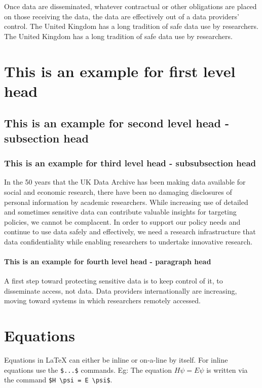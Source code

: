 \documentclass[unnumsec,webpdf,contemporary,large]{oup-authoring-template}%
\theoremstyle{thmstyleone}%
\theoremstyle{thmstyletwo}%
\theoremstyle{thmstylethree}%
\begin{document}
Once data are disseminated, whatever contractual or other obligations are placed on those receiving the data, the data
are effectively out of a data providers' control.  The United Kingdom has a long tradition of safe data use by researchers.
The United Kingdom has a long tradition of safe data use by researchers.

\section{This is an example for first level head}\label{sec3}

\subsection{This is an example for second level head - subsection head}\label{subsec2}

\subsubsection{This is an example for third level head - subsubsection head}\label{subsubsec2}

In the 50 years that the UK Data Archive has been making data available for social and economic research, there have been no
damaging disclosures of personal information by academic researchers. While increasing use of detailed and sometimes sensitive
data can contribute valuable insights for targeting policies, we cannot be
complacent. In order to support our policy needs and continue to use data safely and effectively, we
need a research infrastructure that data confidentiality while enabling researchers to undertake
innovative research.

\paragraph{This is an example for fourth level head - paragraph head}

A first step toward protecting sensitive data is to keep control of it, to disseminate access, not data. Data providers internationally are increasing, moving toward systems in which researchers remotely accessed.



\section{Equations}\label{sec4}
Equations in \LaTeX{} can either be inline or on-a-line by itself. For inline equations use the \verb+$...$+ commands. Eg: The equation
$H\psi = E \psi$ is written via the command \verb+$H \psi = E \psi$+.
\end{document}
